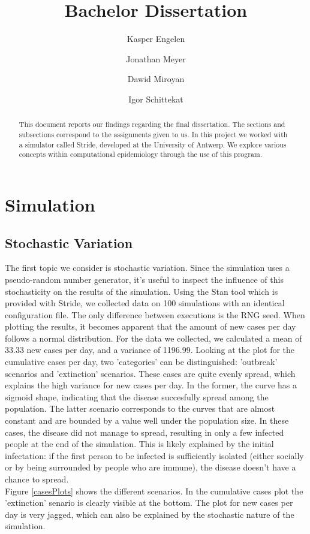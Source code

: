 \documentclass[runningheads]{llncs}
\begin{document}
%
\title{Bachelor Dissertation}
%
%
\author{Kasper Engelen\and
		Jonathan Meyer\and
		Dawid Miroyan\and
		Igor Schittekat}
%
%
%
\maketitle              %
%
\begin{abstract}
This document reports our findings regarding the final dissertation. The sections and subsections correspond to the assignments given to us. In this project we worked with a simulator called Stride, developed at the University of Antwerp. We explore various concepts within computational epidemiology through the use of this program. 

\end{abstract}
%
%
%
\section{Simulation}
\subsection{Stochastic Variation}
The first topic we consider is stochastic variation. Since the simulation uses a pseudo-random number generator, it's useful to inspect the influence of this stochasticity on the results of the simulation. Using the Stan tool which is provided with Stride, we collected data on 100 simulations with an identical configuration file. The only difference between executions is the RNG seed. When plotting the results, it becomes apparent that the amount of new cases per day follows a normal distribution. For the data we collected, we calculated a  mean of 33.33 new cases per day, and a variance of 1196.99. Looking at the plot for the cumulative cases per day, two 'categories' can be distinguished:  'outbreak' scenarios and 'extinction' scenarios. These cases are quite evenly spread, which explains the high variance for new cases per day. In the former, the curve has a sigmoid shape, indicating that the disease succesfully spread among the population. The latter scenario corresponds to the curves that are almost constant and are bounded by a value well under the population size. In these cases, the disease did not manage to spread, resulting in only a few infected people at the end of the simulation. This is likely explained by the initial infectation: if the first person to be infected is sufficiently isolated (either socially or by being surrounded by people who are immune), the disease doesn't have a chance to spread.\\
Figure \ref{casesPlots} shows the different scenarios. In the cumulative cases plot the 'extinction' senario is clearly visible at the bottom. The plot for new cases per day is very jagged, which can also be explained by the stochastic nature of the simulation.
\end{document}
